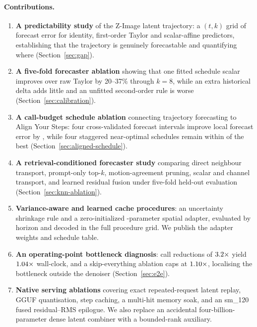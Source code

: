 \documentclass[11pt,a4paper]{article}
\begin{document}
\paragraph{Contributions.}
\begin{enumerate}
  \item \textbf{A predictability study} of the Z-Image \citep{zimage2025} latent
    trajectory: a $(t,k)$ grid of forecast error for identity, first-order
    Taylor and scalar-affine predictors, establishing that the trajectory is
    genuinely forecastable and quantifying where (Section~\ref{sec:gap}).
  \item \textbf{A five-fold forecaster ablation} showing that one fitted
    schedule scalar improves over raw Taylor by 20--37\% through $k=8$, while an extra
    historical delta adds little and an unfitted second-order rule is worse
    (Section~\ref{sec:calibration}).
  \item \textbf{A call-budget schedule ablation} connecting trajectory
    forecasting to Align Your Steps: four cross-validated forecast intervals improve
    local forecast error by \AlignedFourImprovement{}, while four staggered
    near-optimal schedules remain within \StaggeredGap{} of the best
    (Section~\ref{sec:aligned-schedule}).
  \item \textbf{A retrieval-conditioned forecaster study} comparing direct
    neighbour transport, prompt-only top-$k$, motion-agreement pruning, scalar
    and channel transport, and learned residual fusion under five-fold held-out
    evaluation (Section~\ref{sec:knn-ablation}).
  \item \textbf{Variance-aware and learned cache procedures}: an uncertainty
    shrinkage rule and a zero-initialized \CacheAdapterParameters-parameter
    spatial adapter, evaluated by horizon and decoded in the full procedure
    grid. We publish the adapter weights and schedule table.
  \item \textbf{An operating-point bottleneck diagnosis}: call reductions
    of $3.2\times$ yield $1.04\times$
    wall-clock, and a skip-everything ablation caps at
    $1.10\times$, localising the bottleneck outside the
    denoiser (Section~\ref{sec:e2e}).
  \item \textbf{Native serving ablations} covering exact repeated-request
    latent replay, GGUF quantisation, step caching, a multi-hit memory soak, and
    an sm\_120 fused residual--RMS epilogue. We also replace an accidental
    four-billion-parameter dense latent combiner with a bounded-rank auxiliary.

\end{enumerate}
\end{document}
